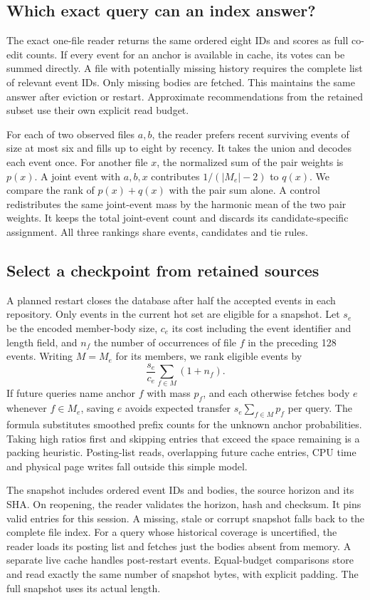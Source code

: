 \documentclass[conference]{IEEEtran}
\begin{document}
\subsection{Which exact query can an index answer?}
The exact one-file reader returns the same ordered eight IDs and scores as full co-edit counts. If every event for an anchor is available in cache, its votes can be summed directly. A file with potentially missing history requires the complete list of relevant event IDs. Only missing bodies are fetched. This maintains the same answer after eviction or restart. Approximate recommendations from the retained subset use their own explicit read budget.

For each of two observed files $a,b$, the reader prefers recent surviving events of size at most six and fills up to eight by recency. It takes the union and decodes each event once. For another file $x$, the normalized sum of the pair weights is $p(x)$. A joint event with $a,b,x$ contributes $1/(|M_e|-2)$ to $q(x)$. We compare the rank of $p(x)+q(x)$ with the pair sum alone. A control redistributes the same joint-event mass by the harmonic mean of the two pair weights. It keeps the total joint-event count and discards its candidate-specific assignment. All three rankings share events, candidates and tie rules.

\subsection{Select a checkpoint from retained sources}
A planned restart closes the database after half the accepted events in each repository. Only events in the current hot set are eligible for a snapshot. Let $s_e$ be the encoded member-body size, $c_e$ its cost including the event identifier and length field, and $n_f$ the number of occurrences of file $f$ in the preceding 128 events. Writing $M=M_e$ for its members, we rank eligible events by
\[
     \frac{s_e}{c_e}\sum_{f\in M}(1+n_f).
\]
If future queries name anchor $f$ with mass $p_f$, and each otherwise fetches body $e$ whenever $f\in M_e$, saving $e$ avoids expected transfer $s_e\sum_{f\in M}p_f$ per query. The formula substitutes smoothed prefix counts for the unknown anchor probabilities. Taking high ratios first and skipping entries that exceed the space remaining is a packing heuristic. Posting-list reads, overlapping future cache entries, CPU time and physical page writes fall outside this simple model.

The snapshot includes ordered event IDs and bodies, the source horizon and its SHA. On reopening, the reader validates the horizon, hash and checksum. It pins valid entries for this session. A missing, stale or corrupt snapshot falls back to the complete file index. For a query whose historical coverage is uncertified, the reader loads its posting list and fetches just the bodies absent from memory. A separate live cache handles post-restart events. Equal-budget comparisons store and read exactly the same number of snapshot bytes, with explicit padding. The full snapshot uses its actual length.
\end{document}
